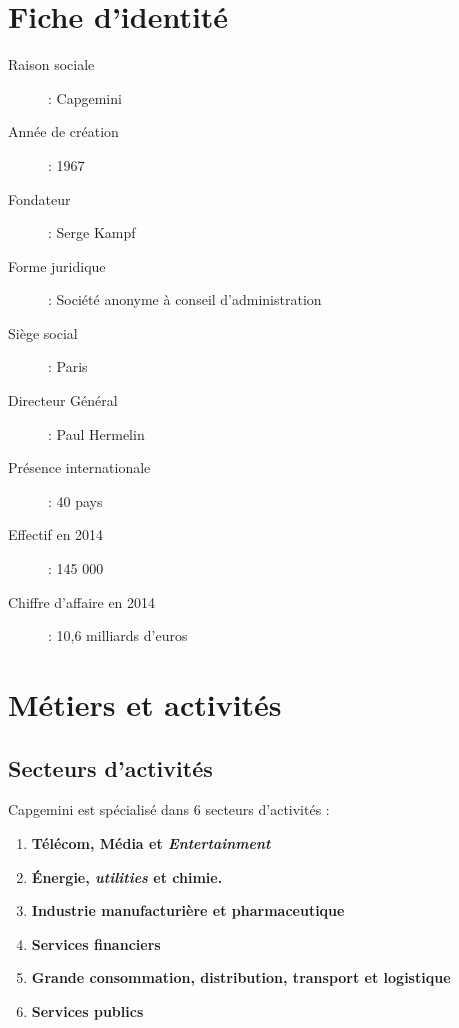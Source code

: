 \section{Fiche d'identité}
\begin{description}
  \item[Raison sociale] : Capgemini
  \item[Année de création] : 1967
  \item[Fondateur] : Serge Kampf
  \item[Forme juridique] : Société anonyme à conseil d'administration
  \item[Siège social] : Paris
  \item[Directeur Général] : Paul Hermelin
  \item[Présence internationale] : 40 pays
  \item[Effectif en 2014] : 145 000
  \item[Chiffre d'affaire en 2014] : 10,6 milliards d'euros
\end{description}

\section{Métiers et activités}
\subsection{Secteurs d'activités}
Capgemini est spécialisé dans 6 secteurs d'activités :
\\
\begin{enumerate}
\item \textbf{Télécom, Média et \textit{Entertainment}}
\item \textbf{\'Energie, \textit{utilities} et chimie.}
\item \textbf{Industrie manufacturière et pharmaceutique}
\item \textbf{Services financiers}
\item \textbf{Grande consommation, distribution, transport et logistique}
\item \textbf{Services publics}\\
\end{enumerate}

